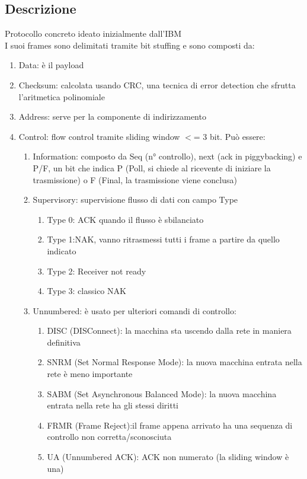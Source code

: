 \documentclass[10pt,oneside,a4paper]{article}
\begin{document}
\subsection{Descrizione}
Protocollo concreto ideato inizialmente dall'IBM\\
I suoi frames sono delimitati tramite bit stuffing e sono composti da:\\
\begin{enumerate}
\item Data: è il payload
\item Checksum: calcolata usando CRC, una tecnica di error detection che sfrutta l'aritmetica polinomiale
\item Address: serve per la componente di indirizzamento
\item Control: flow control tramite sliding window $<$= 3 bit. Può essere:
\begin{enumerate}
\item Information: composto da Seq (n° controllo), next (ack in piggybacking) e P/F, un bit che indica P (Poll, si chiede al ricevente di iniziare la trasmissione) o F (Final, la trasmissione viene conclusa) 
\item Supervisory: supervisione flusso di dati con campo Type 
\begin{enumerate}
\item Type 0: ACK quando il flusso è sbilanciato
\item Type 1:NAK, vanno ritrasmessi tutti i frame a partire da quello indicato
\item Type 2: Receiver not ready
\item Type 3: classico NAK
\end{enumerate}
\item Unnumbered: è usato per ulteriori comandi di controllo:
\begin{enumerate}
\item DISC (DISConnect): la macchina sta uscendo dalla rete in maniera definitiva
\item SNRM (Set Normal Response Mode): la nuova macchina entrata nella rete è meno importante
\item SABM (Set Asynchronous Balanced Mode): la nuova macchina entrata nella rete ha gli stessi diritti
\item FRMR (Frame Reject):il frame appena arrivato ha una sequenza di controllo non corretta/sconosciuta
\item UA (Unnumbered ACK): ACK non numerato (la sliding window è una)
\end{enumerate}
\end{enumerate}
\end{enumerate}
\end{document}
